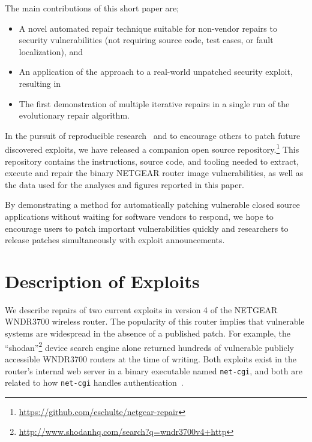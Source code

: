 \documentclass{sigcomm-alternate}
\begin{document}
The main  contributions of this short paper are;
\begin{itemize}
\item A novel automated repair technique suitable for non-vendor repairs to
security vulnerabilities (not requiring source code, test cases, or fault
localization), and 
\item An application of the approach to a real-world unpatched
security exploit, resulting in
\item The first demonstration of multiple iterative repairs in a single
run of the evolutionary repair algorithm.
\end{itemize}

In the pursuit of reproducible
research~\cite{buckheit1995wavelab,mesirov2010accessible} and to encourage
others to patch
future discovered exploits, we have released a companion open source
repository.\footnote{\url{https://github.com/eschulte/netgear-repair}}
This repository contains the instructions, source
code, and tooling needed to extract, execute and repair the binary
NETGEAR router image vulnerabilities, as well as the data used for the
analyses and figures reported  in this paper.

By demonstrating a method for automatically patching vulnerable closed source
applications without waiting for software vendors to respond, we hope to encourage
users to patch important vulnerabilities quickly and researchers to
release patches simultaneously
with exploit announcements.

\section{Description of Exploits}
\label{sec-2}
We describe repairs of two current exploits in version 4 of the NETGEAR WNDR3700
wireless router. The popularity of this router implies that vulnerable
systems are widespread in the absence of a published patch. For example, the
``shodan''\footnote{\url{http://www.shodanhq.com/search?q=wndr3700v4+http}}
device search engine alone returned hundreds of vulnerable publicly
accessible WNDR3700 routers at the time of writing.
Both exploits exist in the router's internal web server in a binary
executable named \texttt{net-cgi}, and both are related to how
\texttt{net-cgi} handles authentication~\cite{zcutlip}.
\end{document}
